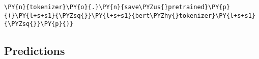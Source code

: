\documentclass[../main.tex]{subfiles}
\begin{document}
    \begin{tcolorbox}[breakable, size=fbox, boxrule=1pt, pad at break*=1mm,colback=cellbackground, colframe=cellborder]
\begin{Verbatim}[commandchars=\\\{\}]
\PY{n}{tokenizer}\PY{o}{.}\PY{n}{save\PYZus{}pretrained}\PY{p}{(}\PY{l+s+s1}{\PYZsq{}}\PY{l+s+s1}{bert\PYZhy{}tokenizer}\PY{l+s+s1}{\PYZsq{}}\PY{p}{)}
\end{Verbatim}
\end{tcolorbox}

\newpage

    \subsection{Predictions}\label{predictions}
\end{document}
